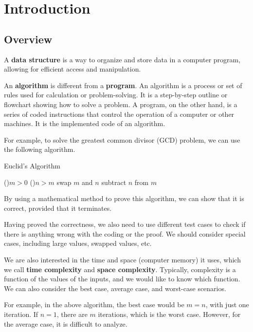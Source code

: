 \chapter{Introduction}

\section{Overview}
A \textbf{data structure} is a way to organize and store data in a computer program, allowing for efficient access and manipulation.

An \textbf{algorithm} is different from a \textbf{program}. An algorithm is a process or set of rules used for calculation or problem-solving. It is a step-by-step outline or flowchart showing how to solve a problem. A program, on the other hand, is a series of coded instructions that control the operation of a computer or other machines. It is the implemented code of an algorithm.

For example, to solve the greatest common divisor (GCD) problem, we can use the following algorithm.

\begin{algorithm}[H]
	\DontPrintSemicolon{}
	\caption{Euclid's Algorithm}
	\BlankLine
	\While(){\(m > 0\)}{
		\If(){\(n > m\)}{
      swap \(m\) and \(n\) 
    }
    subtract \(n\) from \(m\) 
	}
	\;
\end{algorithm}

By using a mathematical method to prove this algorithm, we can show that it is correct, provided that it terminates. 

Having proved the correctness, we also need to use different test cases to check if there is anything wrong with the coding or the proof. We should consider special cases, including large values, swapped values, etc.

We are also interested in the time and space (computer memory) it uses, which we call \textbf{time complexity} and \textbf{space complexity}. Typically, complexity is a function of the values of the inputs, and we would like to know which function. We can also consider the best case, average case, and worst-case scenarios.

For example, in the above algorithm, the best case would be \(m = n\), with just one iteration. If \(n = 1\), there are \(m\) iterations, which is the worst case. However, for the average case, it is difficult to analyze.

